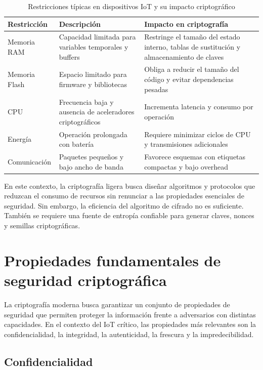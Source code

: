 \begin{table}[H]
\centering
\caption{Restricciones típicas en dispositivos IoT y su impacto criptográfico}
\label{tab:restricciones_iot}
\begin{tabularx}{\textwidth}{@{}p{}p{}X@{}}
\toprule
\textbf{Restricción} & \textbf{Descripción} & \textbf{Impacto en criptografía} \\
\midrule
Memoria RAM & Capacidad limitada para variables temporales y buffers & Restringe el tamaño del estado interno, tablas de sustitución y almacenamiento de claves \\
Memoria Flash & Espacio limitado para firmware y bibliotecas & Obliga a reducir el tamaño del código y evitar dependencias pesadas \\
CPU & Frecuencia baja y ausencia de aceleradores criptográficos & Incrementa latencia y consumo por operación \\
Energía & Operación prolongada con batería & Requiere minimizar ciclos de CPU y transmisiones adicionales \\
Comunicación & Paquetes pequeños y bajo ancho de banda & Favorece esquemas con etiquetas compactas y bajo overhead \\
\bottomrule
\end{tabularx}
\end{table}

En este contexto, la criptografía ligera busca diseñar algoritmos y protocolos que reduzcan el consumo de recursos sin renunciar a las propiedades esenciales de seguridad. Sin embargo, la eficiencia del algoritmo de cifrado no es suficiente. También se requiere una fuente de entropía confiable para generar claves, nonces y semillas criptográficas.

\section{Propiedades fundamentales de seguridad criptográfica}

La criptografía moderna busca garantizar un conjunto de propiedades de seguridad que permiten proteger la información frente a adversarios con distintas capacidades. En el contexto del IoT crítico, las propiedades más relevantes son la confidencialidad, la integridad, la autenticidad, la frescura y la impredecibilidad.

\subsection{Confidencialidad}

